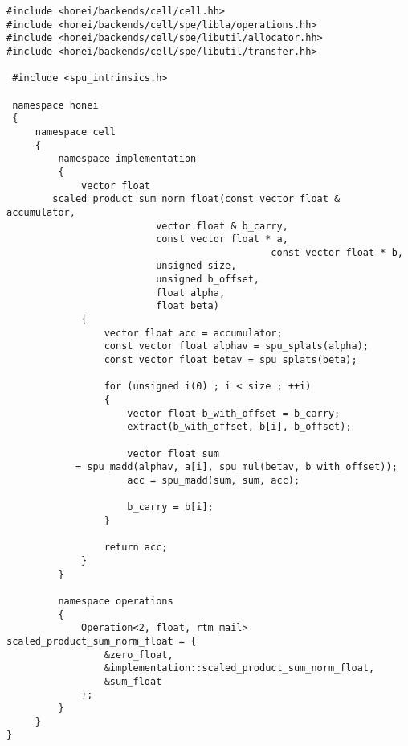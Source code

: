 \documentclass{article}
\begin{document}
\begin{lstlisting}[float, caption= Developing kernels - CELL Implementation, label=list_11]
#include <honei/backends/cell/cell.hh>
#include <honei/backends/cell/spe/libla/operations.hh>
#include <honei/backends/cell/spe/libutil/allocator.hh>
#include <honei/backends/cell/spe/libutil/transfer.hh>

 #include <spu_intrinsics.h>

 namespace honei
 {
     namespace cell
     {
         namespace implementation
         {
             vector float
		scaled_product_sum_norm_float(const vector float & accumulator,
					      vector float & b_carry,
					      const vector float * a,
                                              const vector float * b,
					      unsigned size,
					      unsigned b_offset,
					      float alpha,
					      float beta)
             {
                 vector float acc = accumulator;
                 const vector float alphav = spu_splats(alpha);
                 const vector float betav = spu_splats(beta);

                 for (unsigned i(0) ; i < size ; ++i)
                 {
                     vector float b_with_offset = b_carry;
                     extract(b_with_offset, b[i], b_offset);

                     vector float sum
			= spu_madd(alphav, a[i], spu_mul(betav, b_with_offset));
                     acc = spu_madd(sum, sum, acc);

                     b_carry = b[i];
                 }

                 return acc;
             }
         }

         namespace operations
         {
             Operation<2, float, rtm_mail> scaled_product_sum_norm_float = {
                 &zero_float,
                 &implementation::scaled_product_sum_norm_float,
                 &sum_float
             };
         }
     }
}

\end{lstlisting}
\end{document}
